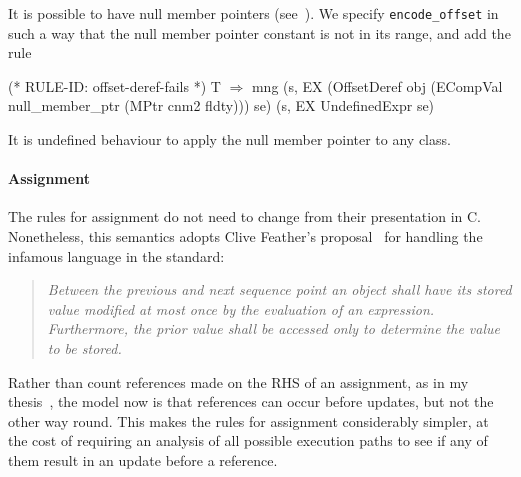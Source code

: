 \documentclass[11pt]{article}
\begin{document}
It is possible to have null member pointers
(see~\cite[\S4.11]{cpp-standard-iso14882}).  We specify
\texttt{encode_offset} in such a way that the null member pointer
constant is not in its range, and add the rule
%
\begin{stdrule}
(* RULE-ID: offset-deref-fails *)
     T
   \(\Rightarrow\)
     mng (s, EX (OffsetDeref
                   obj
                   (ECompVal null_member_ptr (MPtr cnm2 fldty)))
                se)
         (s, EX UndefinedExpr se)
\end{stdrule}
It is undefined behaviour to apply the null member pointer to any
class.

\paragraph{Assignment}
\label{sec:assignment}
The rules for assignment do not need to change from their presentation
in C.  Nonetheless, this semantics adopts Clive
Feather's proposal~\cite{Feather2000} for
handling the infamous language in the standard:
\begin{quotation}
\itshape
    Between the previous and next sequence point an  object
    shall  have  its  stored  value modified at most once by the
    evaluation of an expression.  Furthermore, the  prior  value
    shall  be  accessed  only  to  determine  the  value  to  be
    stored.
\end{quotation}
Rather than count references made on the RHS of an assignment, as in
my thesis~\cite{Norrish98}, the model now is that references can occur
before updates, but not the other way round.  This makes the rules for
assignment considerably simpler, at the cost of requiring an analysis
of all possible execution paths to see if any of them result in an
update before a reference.
\end{document}
